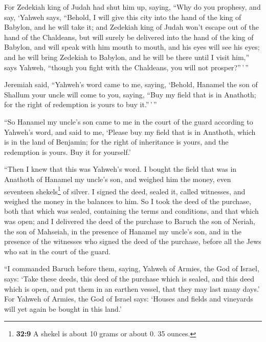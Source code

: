  For Zedekiah king of Judah had shut him up, saying, ``Why
do you prophesy, and say, `Yahweh says, ``Behold, I will give this city
into the hand of the king of Babylon, and he will take it;
 and Zedekiah king of Judah won't escape out of the hand
of the Chaldeans, but will surely be delivered into the hand of the king
of Babylon, and will speak with him mouth to mouth, and his eyes will
see his eyes;  and he will bring Zedekiah to Babylon, and
he will be there until I visit him,'' says Yahweh, ``though you fight
with the Chaldeans, you will not prosper?''\,'\,''

 Jeremiah said, ``Yahweh's word came to me, saying,
 `Behold, Hanamel the son of Shallum your uncle will come
to you, saying, ``Buy my field that is in Anathoth; for the right of
redemption is yours to buy it.''\,'\,''

 ``So Hanamel my uncle's son came to me in the court of
the guard according to Yahweh's word, and said to me, `Please buy my
field that is in Anathoth, which is in the land of Benjamin; for the
right of inheritance is yours, and the redemption is yours. Buy it for
yourself.'

``Then I knew that this was Yahweh's word.  I bought the
field that was in Anathoth of Hanamel my uncle's son, and weighed him
the money, even seventeen shekels\footnote{\textbf{32:9} A shekel is
  about 10 grams or about 0. 35 ounces.} of silver.  I
signed the deed, sealed it, called witnesses, and weighed the money in
the balances to him.  So I took the deed of the purchase,
both that which was sealed, containing the terms and conditions, and
that which was open;  and I delivered the deed of the
purchase to Baruch the son of Neriah, the son of Mahseiah, in the
presence of Hanamel my uncle's son, and in the presence of the witnesses
who signed the deed of the purchase, before all the Jews who sat in the
court of the guard.

 ``I commanded Baruch before them, saying,
 Yahweh of Armies, the God of Israel, says: `Take these
deeds, this deed of the purchase which is sealed, and this deed which is
open, and put them in an earthen vessel, that they may last many days.'
 For Yahweh of Armies, the God of Israel says: `Houses
and fields and vineyards will yet again be bought in this land.'

